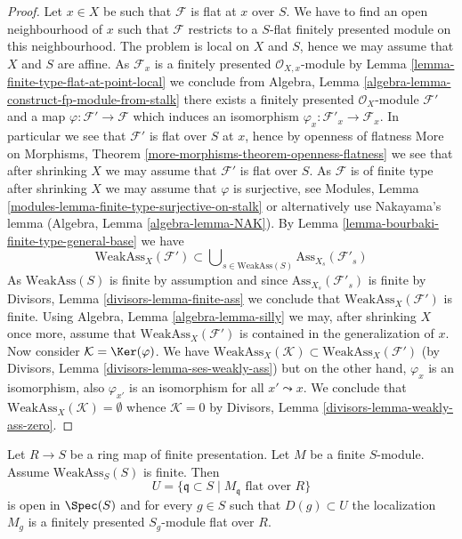 \begin{proof}
Let $x \in X$ be such that $\mathcal{F}$ is flat at $x$ over $S$.
We have to find an open neighbourhood of $x$ such that $\mathcal{F}$ restricts
to a $S$-flat finitely presented module on this neighbourhood.
The problem is local on $X$ and $S$, hence we may assume that $X$ and $S$
are affine. As $\mathcal{F}_x$ is a finitely presented
$\mathcal{O}_{X, x}$-module by
Lemma \ref{lemma-finite-type-flat-at-point-local}
we conclude from
Algebra, Lemma \ref{algebra-lemma-construct-fp-module-from-stalk}
there exists a finitely presented $\mathcal{O}_X$-module $\mathcal{F}'$
and a map $\varphi : \mathcal{F}' \to \mathcal{F}$ which induces
an isomorphism $\varphi_x : \mathcal{F}'_x \to \mathcal{F}_x$. In particular
we see that $\mathcal{F}'$ is flat over $S$ at $x$, hence by openness
of flatness
More on Morphisms, Theorem \ref{more-morphisms-theorem-openness-flatness}
we see that after shrinking $X$ we may assume that
$\mathcal{F}'$ is flat over $S$. As $\mathcal{F}$ is of finite type
after shrinking $X$ we may assume that $\varphi$ is surjective, see
Modules, Lemma \ref{modules-lemma-finite-type-surjective-on-stalk}
or alternatively use Nakayama's lemma
(Algebra, Lemma \ref{algebra-lemma-NAK}).
By
Lemma \ref{lemma-bourbaki-finite-type-general-base}
we have
$$
\text{WeakAss}_X(\mathcal{F}') \subset
\bigcup\nolimits_{s \in \text{WeakAss}(S)} \text{Ass}_{X_s}(\mathcal{F}'_s)
$$
As $\text{WeakAss}(S)$ is finite by assumption and since
$\text{Ass}_{X_s}(\mathcal{F}'_s)$ is finite by
Divisors, Lemma \ref{divisors-lemma-finite-ass}
we conclude that $\text{WeakAss}_X(\mathcal{F}')$ is finite. Using
Algebra, Lemma \ref{algebra-lemma-silly}
we may, after shrinking $X$ once more, assume that
$\text{WeakAss}_X(\mathcal{F}')$ is contained in the generalization
of $x$. Now consider $\mathcal{K} = \Ker(\varphi)$. We have
$\text{WeakAss}_X(\mathcal{K}) \subset \text{WeakAss}_X(\mathcal{F}')$
(by
Divisors, Lemma \ref{divisors-lemma-ses-weakly-ass})
but on the other hand, $\varphi_x$ is an isomorphism, also $\varphi_{x'}$
is an isomorphism for all $x' \leadsto x$. We conclude that
$\text{WeakAss}_X(\mathcal{K}) = \emptyset$ whence
$\mathcal{K} = 0$ by
Divisors, Lemma \ref{divisors-lemma-weakly-ass-zero}.
\end{proof}

\begin{lemma}
\label{lemma-finite-type-flat-algebra}
Let $R \to S$ be a ring map of finite presentation.
Let $M$ be a finite $S$-module. Assume $\text{WeakAss}_S(S)$ is finite.
Then
$$
U = \{\mathfrak q \subset S \mid M_{\mathfrak q}\text{ flat over }R\}
$$
is open in $\Spec(S)$ and for every $g \in S$ such that
$D(g) \subset U$ the localization $M_g$ is a finitely presented
$S_g$-module flat over $R$.
\end{lemma}

